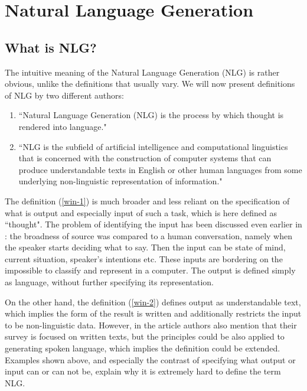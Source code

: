 \chapter{Natural Language Generation}\label{chap:nlg}

\section{What is NLG?}
The intuitive meaning of the Natural Language Generation (NLG) is rather obvious, unlike the definitions that usually vary. We will now present definitions of NLG by two different authors:
\begin{enumerate}
	\item ``Natural Language Generation (NLG) is the process by which thought is rendered into language."\label{win-1}\citep{mcdonald2010natural}
	\item ``NLG is the subfield of artificial intelligence and computational linguistics that is concerned with the construction of computer systems that can produce understandable texts in English or other human languages from some underlying non-linguistic representation of information."\label{win-2}\citep{reiter1997building}
\end{enumerate}

The definition (\ref{win-1}) is much broader and less reliant on the specification of what is output and especially input of such a task, which is here defined as ``thought". The problem of identifying the input has been discussed even earlier in \citet{mcdonald1993issues}: the broadness of source was compared to a human conversation, namely when the speaker starts deciding what to say. Then the input can be state of mind, current situation, speaker’s intentions etc. These inputs are bordering on the impossible to classify and represent in a computer. The output is defined simply as language, without further specifying its representation. 

On the other hand, the definition (\ref{win-2}) defines output as understandable text, which implies the form of the result is written and additionally restricts the input to be non-linguistic data. However, in the article authors also mention that their survey is focused on written texts, but the principles could be also applied to generating spoken language, which implies the definition could be extended. Examples shown above, and especially the contrast of specifying what output or input can or can not be, explain why it is extremely hard to define the term NLG.
 
